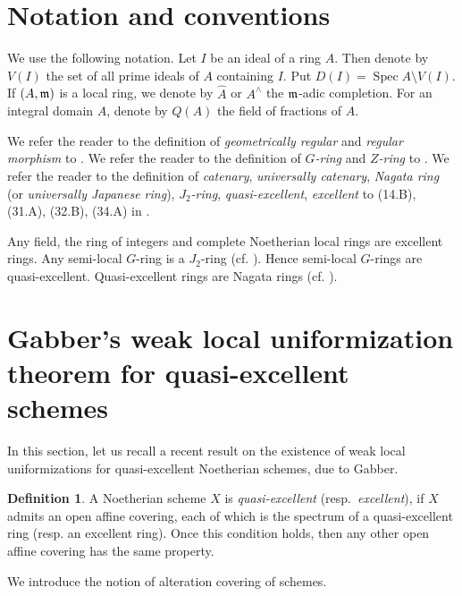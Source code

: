 \documentclass[11pt,a4paper]{amsart}
\theoremstyle{definition}
\newtheorem{definition}[theorem]{Definition}
\theoremstyle{remark}
\newcommand{\Spec}{\operatorname{Spec}}
\newcommand{\fm}{\frak{m}}
\begin{document}
\section{Notation and conventions}
\label{quasi-excellent1}



We use the following notation. Let $I$ be an ideal of a ring $A$. Then denote by $V(I)$ the set of all prime ideals of $A$ containing $I$. 
Put $D(I)=\Spec A \setminus V(I)$.
If $(A,\fm)$ is a local ring, we denote by $\widehat{A}$ or $A^\wedge$ the $\fm$-adic completion. For an integral domain $A$, denote by $Q(A)$ the field of fractions of $A$. 

We refer the reader to the definition of \textit{geometrically regular} and \textit{regular morphism} to \cite[(33.A)]{Ma80}. We refer the reader to the definition of \textit{$G$-ring} and \textit{$Z$-ring} to \cite[Definition~(0.1)]{Nishimura87}. We refer the reader to the definition of \textit{catenary}, \textit{universally catenary}, \textit{Nagata ring} (or \textit{universally Japanese ring}), \textit{$J_2$-ring}, \textit{quasi-excellent}, \textit{excellent} to (14.B),  (31.A),  (32.B),  (34.A) in \cite{Ma80}. 

Any field, the ring of integers and complete Noetherian local rings are excellent rings. Any semi-local $G$-ring is a $J_2$-ring (cf. \cite[Theorem 76]{Ma80}). Hence semi-local $G$-rings are quasi-excellent.
Quasi-excellent rings are Nagata rings (cf. \cite[Theorem 78]{Ma80}). 




\section{Gabber's weak local uniformization theorem for quasi-excellent schemes}
\label{quasi-excellent2}


In this section, let us recall a recent result on the existence of weak local uniformizations for quasi-excellent Noetherian schemes, due to Gabber.


\begin{definition}
A Noetherian scheme $X$ is \textit{quasi-excellent} (resp.\ \textit{excellent}), if $X$ admits an open affine covering, each of which is the spectrum of a quasi-excellent ring (resp. an excellent ring). Once this condition holds, then any other open affine covering has the same property.
\end{definition}


We introduce the notion of alteration covering of schemes.
\end{document}

